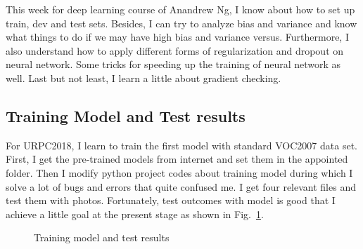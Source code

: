 \documentclass[a4paper]{article}
\begin{document}
This week for deep learning course of Anandrew Ng, I know about how to set up train, dev and test sets. Besides, I can try to analyze bias and variance and know what things to do if we may have high bias and variance versus. Furthermore, I also understand how to apply different forms of regularization and dropout on neural network. Some tricks for speeding up the training of neural network as well. Last but not least, I learn a little about gradient checking.

\subsection{Training Model and Test results}

For URPC2018, I learn to train the first model with standard VOC2007 data set. First, I get the pre-trained models from internet and set them in the appointed folder. Then I modify python project codes about training model during which I solve a lot of bugs and errors that quite confused me. I get four relevant files and test them with photos. Fortunately, test outcomes with model is good that I achieve a little goal at the present stage as shown in Fig.~\ref{p17}.
\begin{figure}[b] 
	\centering 
	\caption{Training model and test results} 
	\label{p17} %
\end{figure}
\end{document}
